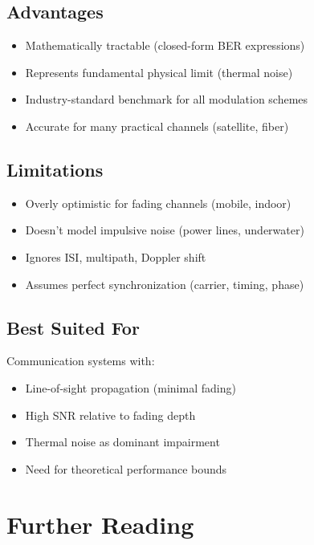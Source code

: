 \subsection*{Advantages}

\begin{itemize}
\item Mathematically tractable (closed-form BER expressions)
\item Represents fundamental physical limit (thermal noise)
\item Industry-standard benchmark for all modulation schemes
\item Accurate for many practical channels (satellite, fiber)
\end{itemize}

\subsection*{Limitations}

\begin{itemize}
\item Overly optimistic for fading channels (mobile, indoor)
\item Doesn't model impulsive noise (power lines, underwater)
\item Ignores ISI, multipath, Doppler shift
\item Assumes perfect synchronization (carrier, timing, phase)
\end{itemize}

\subsection*{Best Suited For}

Communication systems with:
\begin{itemize}
\item Line-of-sight propagation (minimal fading)
\item High SNR relative to fading depth
\item Thermal noise as dominant impairment
\item Need for theoretical performance bounds
\end{itemize}

\section{Further Reading}

